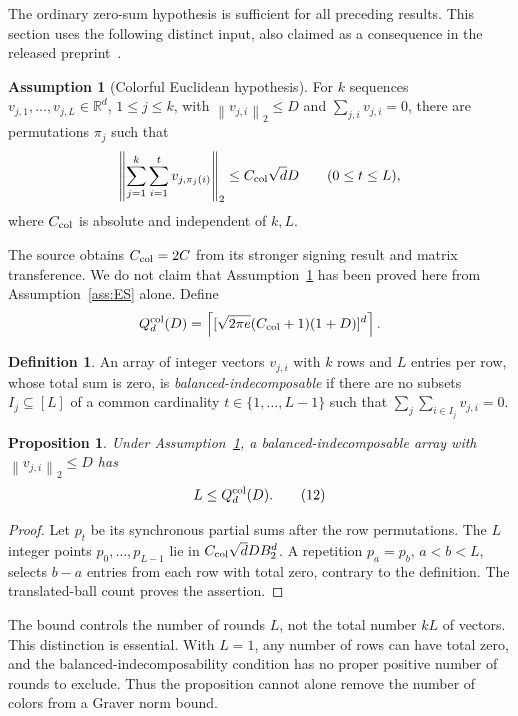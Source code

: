 \documentclass[11pt]{article}
\newtheorem{proposition}[theorem]{Proposition}
\theoremstyle{definition}
\newtheorem{definition}[theorem]{Definition}
\newtheorem{assumption}[theorem]{Assumption}
\theoremstyle{remark}
\newcommand{\R}{\mathbb R}
\newcommand{\norm}[1]{\left\lVert #1\right\rVert}
\begin{document}
The ordinary zero-sum hypothesis is sufficient for all preceding results.
This section uses the following distinct input, also claimed as a
consequence in the released preprint~\cite{ES2026}.

\begin{assumption}[Colorful Euclidean hypothesis]\label{ass:colorful}
For $k$ sequences $v_{j,1},\ldots,v_{j,L}\in\R^d$, $1\le j\le k$,
with $\norm{v_{j,i}}_2\le D$ and $\sum_{j,i}v_{j,i}=0$, there are
permutations $\pi_j$ such that
\[
 \norm{\sum_{j=1}^k\sum_{i=1}^{t}v_{j,\pi_j(i)}}_2
 \le C_{\rm col}\sqrt d D\qquad(0\le t\le L),
\]
where $C_{\rm col}$ is absolute and independent of $k,L$.
\end{assumption}

The source obtains $C_{\rm col}=2C$ from its stronger signing result
and matrix transference. We do not claim that
Assumption~\ref{ass:colorful} has been proved here from
Assumption~\ref{ass:ES} alone. Define
\[
 Q^{\rm col}_d(D)=
 \left\lceil[\sqrt{2\pi e}(C_{\rm col}+1)(1+D)]^d\right\rceil.
\]

\begin{definition}
An array of integer vectors $v_{j,i}$ with $k$ rows and $L$ entries per
row, whose total sum is zero, is \emph{balanced-indecomposable} if there
are no subsets $I_j\subseteq[L]$ of a common cardinality
$t\in\{1,\ldots,L-1\}$ such that
$\sum_j\sum_{i\in I_j}v_{j,i}=0$.
\end{definition}

\begin{proposition}\label{prop:balanced}
Under Assumption~\ref{ass:colorful}, a balanced-indecomposable array
with $\norm{v_{j,i}}_2\le D$ has
\[
 L\le Q^{\rm col}_d(D).
 \tag{12}\label{eq:balanced}
\]
\end{proposition}
\begin{proof}
Let $p_t$ be its synchronous partial sums after the row permutations.
The $L$ integer points $p_0,\ldots,p_{L-1}$ lie in
$C_{\rm col}\sqrt d D B_2^d$. A repetition $p_a=p_b$, $a<b<L$,
selects $b-a$ entries from each row with total zero, contrary to the
definition. The translated-ball count proves the assertion.
\end{proof}

The bound controls the number of rounds $L$, not the total number $kL$
of vectors. This distinction is essential. With $L=1$, any number of rows
can have total zero, and the balanced-indecomposability condition has no
proper positive number of rounds to exclude. Thus the proposition cannot
alone remove the number of colors from a Graver norm bound.
\end{document}

